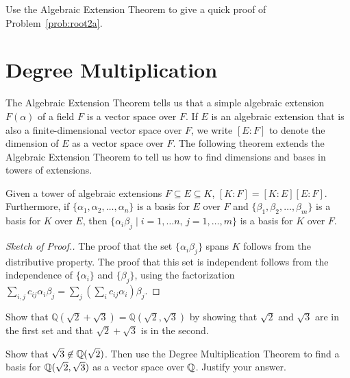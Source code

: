 \begin{problem}
    Use the Algebraic Extension Theorem to give a quick proof of Problem~\ref{prob:root2a}.
\end{problem}


\section{Degree Multiplication}

The Algebraic Extension Theorem tells us that a simple algebraic extension $F(\alpha)$ of a field $F$ is a vector space over $F$. If $E$ is an algebraic extension that is also a finite-dimensional vector space over $F$, we write $[E : F]$ to denote the dimension of $E$ as a vector space over $F$. The following theorem extends the Algebraic Extension Theorem to tell us how to find dimensions and bases in towers of extensions.

\begin{theorem}\label{thm:degmult}
    Given a tower of algebraic extensions $F \subseteq E \subseteq K$, $[K:F]=[K:E][E:F]$. Furthermore, if $\{\alpha_1,\alpha_2,\ldots,\alpha_n\}$ is a basis for $E$ over $F$ and $\{\beta_1,\beta_2,\ldots,\beta_m\}$ is a basis for $K$ over $E$, then $\{\alpha_i\beta_j \mid i=1,\ldots n,\, j=1,\ldots,m \}$ is a basis for $K$ over $F$.
\end{theorem}

\begin{proof}[Sketch of Proof.]
The proof that the set $\{\alpha_i\beta_j\}$ spans $K$ follows from the distributive property. The proof that this set is independent follows from the independence of $\{\alpha_i\}$ and $\{\beta_j\}$, using the factorization $\sum_{i,j} c_{ij}\alpha_i\beta_j = \sum_j \left( \sum_i c_{ij} \alpha_i \right) \beta_j$.
\end{proof}

\begin{problem}
Show that $\mathbb{Q}\left(\sqrt{2}+\sqrt{3}\right) = \mathbb{Q}\left(\sqrt{2}, \sqrt{3}\right)$ by showing that $\sqrt{2}$ and $\sqrt{3}$ are in the first set and that $\sqrt{2}+\sqrt{3}$ is in the second.
\end{problem}



\begin{problem}
    Show that $\sqrt{3}\not\in \mathbb{Q}(\sqrt{2})$. Then use the Degree Multiplication Theorem to find a basis for $\mathbb{Q}(\sqrt{2},\sqrt{3})$ as a vector space over $\mathbb{Q}$. Justify your answer.
\end{problem}



